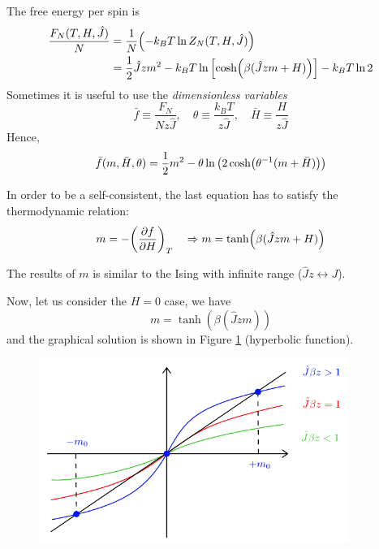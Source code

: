 \documentclass[../main/main.tex]{subfiles}
\begin{document}
The free energy per spin is
\begin{equation}
\begin{split}
  \frac{F_N (T,H,\hat{J} )}{N} & = \frac{1}{N} \qty(-k_B T \ln{Z_N(T,H,\hat{J} )} ) \\
  & = \frac{1}{2} \hat{J} z m^2 - k_B T \ln{\qty[\cosh(\beta (\hat{J}zm+H ))] } - k_B T \ln{2}
\end{split}
\end{equation}
Sometimes it is useful to use the \emph{dimensionless variables}
\begin{equation}
  \bar{f} \equiv \frac{F_N}{N z \hat{J} }, \quad \theta \equiv \frac{k_B T}{z \hat{J} }, \quad \bar{H} \equiv \frac{H}{z \hat{J} }
\end{equation}
Hence,
\begin{equation}
  \bar{f} (m, \bar{H}, \theta  ) = \frac{1}{2}m^2 - \theta \ln{\qty(2 \cosh (\theta ^{-1}(m+\bar{H} ))) }
\end{equation}

In order to be a self-consistent, the last equation has to satisfy the  thermodynamic relation:
\begin{equation}
  m = - \qty( \pdv{f}{H})_T \quad \Rightarrow   m = \tanh (\beta (\hat{J}z m + H  ))
\end{equation}
\begin{remark}
The results of \( m \)  is similar to the Ising with infinite range (\( \hat{J}z \leftrightarrow J  \)).
\end{remark}
Now, let us consider the \( H=0 \) case, we have
\begin{equation}
  m =  \tanh (\beta (\hat{J}z m ))
\end{equation}
and the graphical solution is shown in Figure \ref{fig:11_1} (hyperbolic function).


\begin{figure}[h!]
\centering
\includegraphics[width=0.9\textwidth]{../lessons/11_image/1.pdf}
\caption{\label{fig:11_1}}
\end{figure}
\end{document}
